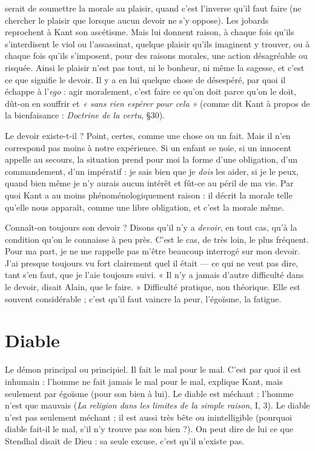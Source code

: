 serait de soumettre la morale au plaisir, quand c’est l'inverse qu’il faut faire (ne
chercher le plaisir que lorsque aucun devoir ne s’y oppose). Les jobards reprochent
à Kant son ascétisme. Mais lui donnent raison, à chaque fois qu'ils
s’interdisent le viol ou l'assassinat, quelque plaisir qu’ils imaginent y trouver,
ou à chaque fois qu’ils s'imposent, pour des raisons morales, une action désagréable
ou risquée. Ainsi le plaisir n’est pas tout, ni le bonheur, ni même la
sagesse, et c’est ce que signifie le devoir. Il y a en lui quelque chose de désespéré,
par quoi il échappe à l’{\it ego} : agir moralement, c’est faire ce qu’on doit parce
qu’on le doit, dût-on en souffrir et {\it « sans rien espérer pour cela »} (comme dit
Kant à propos de la bienfaisance : {\it Doctrine de la vertu}, \S 30).

Le devoir existe-t-il ? Point, certes, comme une chose ou un fait. Mais il
n’en correspond pas moins à notre expérience. Si un enfant se noie, si un innocent
appelle au secours, la situation prend pour moi la forme d’une obligation,
d’un commandement, d’un impératif : je sais bien que je {\it dois} les aider, si je le
peux, quand bien même je n’y aurais aucun intérêt et fût-ce au péril de ma vie.
Par quoi Kant a au moins phénoménologiquement raison : il décrit la morale
telle qu’elle nous apparaît, comme une libre obligation, et c’est la morale
même.

Connaît-on toujours son devoir ? Disons qu’il n’y a {\it devoir}, en tout cas,
qu’à la condition qu’on le connaisse à peu près. C’est le cas, de très loin, le
plus fréquent. Pour ma part, je ne me rappelle pas m'être beaucoup interrogé
sur mon devoir. J'ai presque toujours vu fort clairement quel il était — ce qui
ne veut pas dire, tant s’en faut, que je l’aie toujours suivi. « Il n’y a jamais
d’autre difficulté dans le devoir, disait Alain, que le faire. » Difficulté pratique,
non théorique. Elle est souvent considérable ; c’est qu’il faut vaincre la
peur, l’égoïsme, la fatigue.

\section{Diable}
Le démon principal ou principiel. Il fait le mal pour le mal. C’est
par quoi il est inhumain : l’homme ne fait jamais le mal pour le
mal, explique Kant, mais seulement par égoïsme (pour son bien à lui). Le
diable est méchant ; l’homme n’est que mauvais ({\it La religion dans les limites de
la simple raison}, I, 3).
Le diable n’est pas seulement méchant ; il est aussi très bête ou inintelligible
(pourquoi diable fait-il le mal, s’il n’y trouve pas son bien ?). On peut dire de
lui ce que Stendhal disait de Dieu : sa seule excuse, c’est qu’il n’existe pas.

